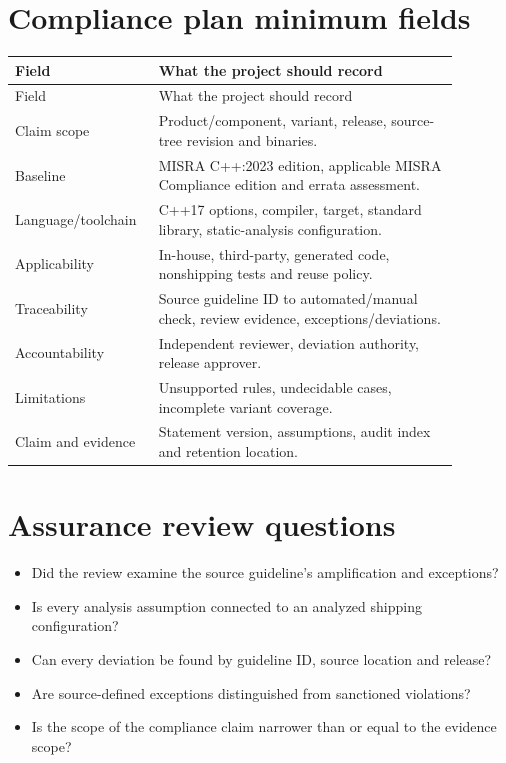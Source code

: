 \documentclass[10pt,letterpaper]{article}
\begin{document}
\section{Compliance plan minimum fields}
\small\setlength{\tabcolsep}{3pt}\renewcommand{\arraystretch}{1.15}
\begin{longtable}{p{0.25\linewidth}p{0.63\linewidth}}
\toprule
Field & What the project should record\\ \midrule
\endfirsthead
\toprule
Field & What the project should record\\ \midrule
\endhead
Claim scope & Product/component, variant, release, source-tree revision and binaries.\\
Baseline & MISRA C++:2023 edition, applicable MISRA Compliance edition and errata assessment.\\
Language/toolchain & C++17 options, compiler, target, standard library, static-analysis configuration.\\
Applicability & In-house, third-party, generated code, nonshipping tests and reuse policy.\\
Traceability & Source guideline ID to automated/manual check, review evidence, exceptions/deviations.\\
Accountability & Independent reviewer, deviation authority, release approver.\\
Limitations & Unsupported rules, undecidable cases, incomplete variant coverage.\\
Claim and evidence & Statement version, assumptions, audit index and retention location.\\
\bottomrule
\end{longtable}
\normalsize

\section{Assurance review questions}
\begin{itemize}
\item Did the review examine the source guideline's amplification and exceptions?
\item Is every analysis assumption connected to an analyzed shipping configuration?
\item Can every deviation be found by guideline ID, source location and release?
\item Are source-defined exceptions distinguished from sanctioned violations?
\item Is the scope of the compliance claim narrower than or equal to the evidence scope?
\end{itemize}
\end{document}
